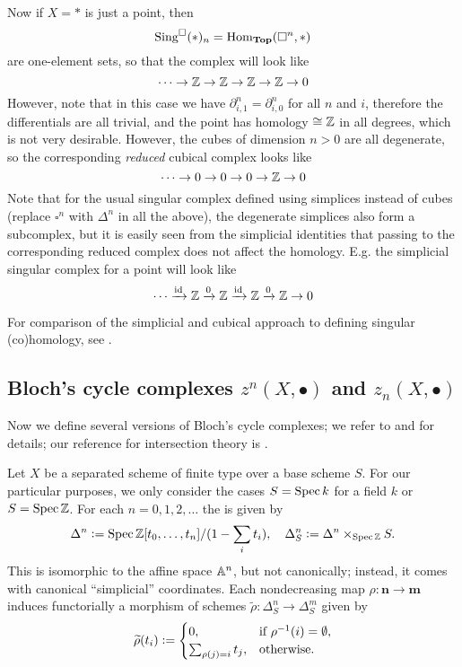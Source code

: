 \begin{remark}
  Now if $X = \ast$ is just a point, then
  $$\Sing^\square (\ast)_n = \Hom_\categ{Top} (\square^n, \ast)$$
  are one-element sets, so that the complex will look like
  $$\cdots \to \ZZ \to \ZZ \to \ZZ \to \ZZ \to 0$$
  However, note that in this case we have $\partial_{i,1}^n = \partial_{i,0}^n$
  for all $n$ and $i$, therefore the differentials
   are all trivial, and the point has homology
  $\isom \ZZ$ in all degrees, which is not very desirable. However, the cubes of
  dimension $n > 0$ are all degenerate, so the corresponding \emph{reduced}
  cubical complex looks like
  $$\cdots \to 0 \to 0 \to 0 \to \ZZ \to 0$$
  Note that for the usual singular complex defined using simplices instead of
  cubes (replace $\square^n$ with $\Delta^n$ in all the above), the degenerate
  simplices also form a subcomplex, but it is easily seen from the simplicial
  identities that passing to the corresponding reduced complex does not affect
  the homology. E.g. the simplicial singular complex for a point will look like
  \[ \cdots \xrightarrow{\idid} \ZZ \xrightarrow{0}
    \ZZ \xrightarrow{\idid} \ZZ \xrightarrow{0} \ZZ \to 0 \]

  For comparison of the simplicial and cubical approach to defining singular
  (co)homology, see \cite{Eilenberg-MacLane-acyclic}.
\end{remark}

\subsection*{Bloch's cycle complexes $z^n (X,\bullet)$ and $z_n (X,\bullet)$}

Now we define several versions of Bloch's cycle complexes; we refer to
\cite{Geisser-survey} and \cite{Bloch-cubical} for details; our reference for
intersection theory is \cite{Fulton-Intersection-Theory}.

\vspace{1em}

Let $X$ be a separated scheme of finite type over a base scheme $S$. For our
particular purposes, we only consider the cases $S = \Spec k$ for a field $k$ or
$S = \Spec\ZZ$. For each $n = 0,1,2,\ldots$ the  is
given by
\[ \Delta^n \dfn \Spec \ZZ [t_0,\ldots,t_n] / (1 - \sum_i t_i),
  \quad \Delta^n_S \dfn \Delta^n\times_{\Spec\ZZ} S. \]
This is isomorphic to the affine space $\AA^n$, but not canonically; instead, it
comes with canonical ``simplicial'' coordinates. Each nondecreasing map
$\rho\colon \mathbf{n} \to \mathbf{m}$ induces functorially a morphism of
schemes $\widetilde{\rho}\colon \Delta^n_S \to \Delta^m_S$ given by
\[ \widetilde{\rho} (t_i) \dfn \begin{cases}
    0, & \text{if } \rho^{-1} (i) = \emptyset, \\
    \sum_{\rho (j) = i} t_j, & \text{otherwise}.
  \end{cases} \]

